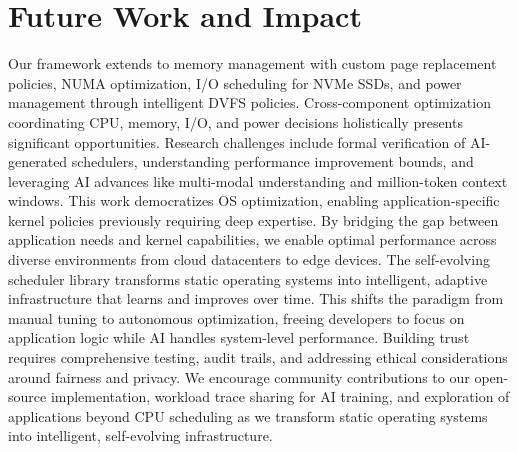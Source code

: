 \section{Future Work and Impact}
\label{sec:future}

Our framework extends to memory management with custom page replacement policies, NUMA optimization, I/O scheduling for NVMe SSDs, and power management through intelligent DVFS policies. Cross-component optimization coordinating CPU, memory, I/O, and power decisions holistically presents significant opportunities. Research challenges include formal verification of AI-generated schedulers, understanding performance improvement bounds, and leveraging AI advances like multi-modal understanding and million-token context windows. This work democratizes OS optimization, enabling application-specific kernel policies previously requiring deep expertise. By bridging the gap between application needs and kernel capabilities, we enable optimal performance across diverse environments from cloud datacenters to edge devices. The self-evolving scheduler library transforms static operating systems into intelligent, adaptive infrastructure that learns and improves over time. This shifts the paradigm from manual tuning to autonomous optimization, freeing developers to focus on application logic while AI handles system-level performance. Building trust requires comprehensive testing, audit trails, and addressing ethical considerations around fairness and privacy. We encourage community contributions to our open-source implementation, workload trace sharing for AI training, and exploration of applications beyond CPU scheduling as we transform static operating systems into intelligent, self-evolving infrastructure.